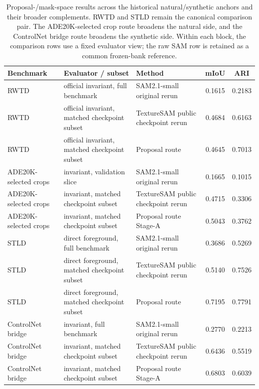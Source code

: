 \begin{table}[t]
\centering
\scriptsize
\setlength{\tabcolsep}{5pt}
\renewcommand{\arraystretch}{0.98}
\begin{tabularx}{\textwidth}{@{}p{}p{}Xcc@{}}
\toprule
Benchmark & Evaluator / subset & Method & mIoU & ARI \\
\midrule
RWTD & official invariant, full benchmark & SAM2.1-small original rerun~\cite{ravi2024sam2} & 0.1615 & 0.2183 \\
RWTD & official invariant, matched checkpoint subset & TextureSAM public checkpoint rerun~\cite{texturesamrepo2026} & 0.4684 & 0.6163 \\
RWTD & official invariant, matched checkpoint subset & Proposal route & 0.4645 & 0.7013 \\
\midrule
ADE20K-selected crops & invariant, validation slice & SAM2.1-small original rerun~\cite{ravi2024sam2} & 0.1665 & 0.1015 \\
ADE20K-selected crops & invariant, matched checkpoint subset & TextureSAM public checkpoint rerun~\cite{texturesamrepo2026} & 0.4715 & 0.3306 \\
ADE20K-selected crops & invariant, matched checkpoint subset & Proposal route Stage-A & 0.5043 & 0.3762 \\
\midrule
STLD & direct foreground, full benchmark & SAM2.1-small original rerun~\cite{ravi2024sam2} & 0.3686 & 0.5269 \\
STLD & direct foreground, matched checkpoint subset & TextureSAM public checkpoint rerun~\cite{texturesamrepo2026} & 0.5140 & 0.7526 \\
STLD & direct foreground, matched checkpoint subset & Proposal route & 0.7195 & 0.7791 \\
\midrule
ControlNet bridge & invariant, full benchmark & SAM2.1-small original rerun~\cite{ravi2024sam2} & 0.2770 & 0.2213 \\
ControlNet bridge & invariant, matched checkpoint subset & TextureSAM public checkpoint rerun~\cite{texturesamrepo2026} & 0.6436 & 0.5519 \\
ControlNet bridge & invariant, matched checkpoint subset & Proposal route Stage-A & 0.6803 & 0.6039 \\
\bottomrule
\end{tabularx}
\caption{Proposal-/mask-space results across the historical natural/synthetic anchors and their broader complements. RWTD and STLD remain the canonical comparison pair. The ADE20K-selected crop route broadens the natural side, and the ControlNet bridge route broadens the synthetic side. Within each block, the comparison rows use a fixed evaluator view; the raw SAM row is retained as a common frozen-bank reference.}
\label{tab:proposal_results}
\end{table}
